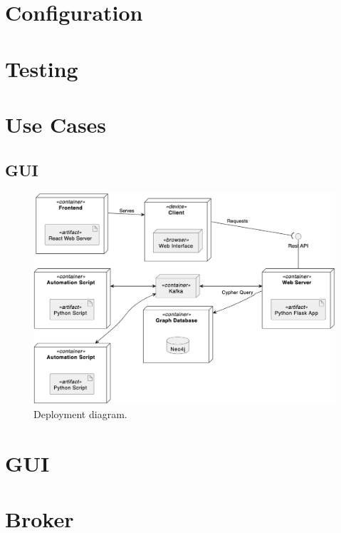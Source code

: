 \documentclass[12pt,a4paper,openright,twoside]{book}
\begin{document}
\section{Configuration}

\section{Testing}

\section{Use Cases}

\subsection{GUI}





\begin{figure}
    \centering
    \includegraphics[width=\linewidth]{figures/diagrams/deployment.png}
    \caption{
        Deployment diagram.
    }
    \label{fig:deployment}
\end{figure}

\section{GUI}

\section{Broker}
\end{document}
